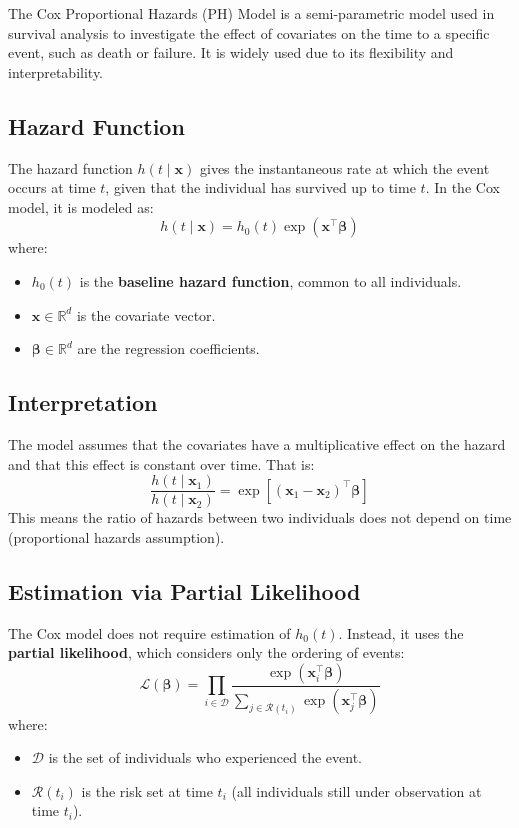 \documentclass[12pt]{article}
\begin{document}
The Cox Proportional Hazards (PH) Model is a semi-parametric model used in survival analysis to investigate the effect of covariates on the time to a specific event, such as death or failure. It is widely used due to its flexibility and interpretability.

\subsection{Hazard Function}

The hazard function $h(t \mid \mathbf{x})$ gives the instantaneous rate at which the event occurs at time $t$, given that the individual has survived up to time $t$. In the Cox model, it is modeled as:
\begin{equation}
h(t \mid \mathbf{x}) = h_0(t) \exp(\mathbf{x}^\top \boldsymbol{\beta})
\end{equation}
where:
\begin{itemize}
  \item $h_0(t)$ is the \textbf{baseline hazard function}, common to all individuals.
  \item $\mathbf{x} \in \mathbb{R}^d$ is the covariate vector.
  \item $\boldsymbol{\beta} \in \mathbb{R}^d$ are the regression coefficients.
\end{itemize}

\subsection{Interpretation}

The model assumes that the covariates have a multiplicative effect on the hazard and that this effect is constant over time. That is:
\begin{equation}
\frac{h(t \mid \mathbf{x}_1)}{h(t \mid \mathbf{x}_2)} = \exp\left[(\mathbf{x}_1 - \mathbf{x}_2)^\top \boldsymbol{\beta}\right]
\end{equation}
This means the ratio of hazards between two individuals does not depend on time (proportional hazards assumption).

\subsection{Estimation via Partial Likelihood}

The Cox model does not require estimation of $h_0(t)$. Instead, it uses the \textbf{partial likelihood}, which considers only the ordering of events:
\begin{equation}
\mathcal{L}(\boldsymbol{\beta}) = \prod_{i \in \mathcal{D}} \frac{\exp(\mathbf{x}_i^\top \boldsymbol{\beta})}{\sum_{j \in \mathcal{R}(t_i)} \exp(\mathbf{x}_j^\top \boldsymbol{\beta})}
\end{equation}
where:
\begin{itemize}
  \item $\mathcal{D}$ is the set of individuals who experienced the event.
  \item $\mathcal{R}(t_i)$ is the risk set at time $t_i$ (all individuals still under observation at time $t_i$).
\end{itemize}
\end{document}
